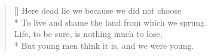 \documentclass[MAIN]{subfiles}
\begin{document}
\settowidth{\versewidth}{Here dead lie we because we did not choose}
\begin{verse}[\versewidth]
Here dead lie we because we did not choose\\*
\vin To live and shame the land from which we sprung.\\
Life, to be sure, is nothing much to lose,\\*
\vin But young men think it is, and we were young.
\end{verse}
\end{document}
